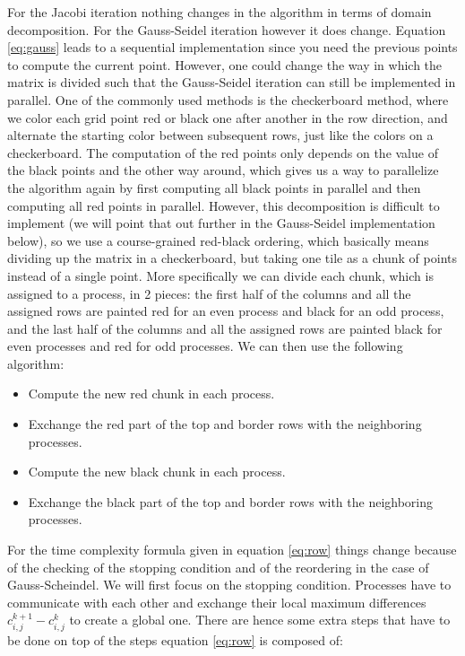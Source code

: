 \documentclass[11pt,a4paper,onecolumn]{article}
\begin{document}
For the Jacobi iteration nothing changes in the algorithm in terms of domain decomposition. For the Gauss-Seidel iteration however it does change. Equation \ref{eq:gauss} leads to a sequential implementation since you need the previous points to compute the current point. However, one could change the way in which the matrix is divided such that the Gauss-Seidel iteration can still be implemented in parallel. One of the commonly used methods is the checkerboard method, where we color each grid point red or black one after another in the row direction, and alternate the starting color between subsequent rows, just like the colors on a checkerboard. The computation of the red points only depends on the value of the black points and the other way around, which gives us a way to parallelize the algorithm again by first computing all black points in parallel and then computing all red points in parallel. However, this decomposition is difficult to implement (we will point that out further in the Gauss-Seidel implementation below), so we use a course-grained red-black ordering, which basically means dividing up the matrix in a checkerboard, but taking one tile as a chunk of points instead of a single point. More specifically we can divide each chunk, which is assigned to a process, in 2 pieces: the first half of the columns and all the assigned rows are painted red for an even process and black for an odd process, and the last half of the columns and all the assigned rows are painted black for even processes and red for odd processes. We can then use the following algorithm:

\begin{itemize}
\item 
  Compute the new red chunk in each process.
\item
  Exchange the red part of the top and border rows with the neighboring processes.
\item
  Compute the new black chunk in each process.
\item
  Exchange the black part of the top and border rows with the neighboring processes.
\end{itemize}

For the time complexity formula given in equation \ref{eq:row} things change because of the checking of the stopping condition and of the reordering in the case of Gauss-Scheindel. We will first focus on the stopping condition. Processes have to communicate with each other and exchange their local maximum differences $c_{i,j}^{k+1} - c_{i,j}^k$ to create a global one. There are hence some extra steps that have to be done on top of the steps equation \ref{eq:row} is composed of:
\end{document}
